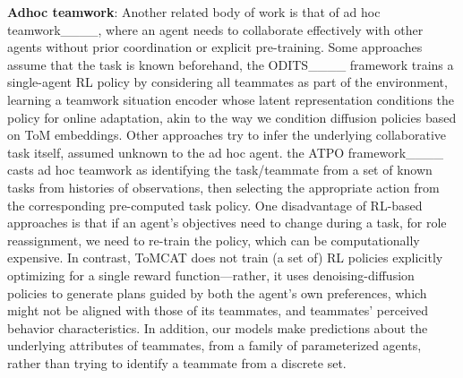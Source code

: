 
\textbf{Adhoc teamwork}: Another related body of work is that of ad hoc teamwork____, where an agent needs to collaborate effectively with other agents without prior coordination or explicit pre-training. Some approaches assume that the task is known beforehand, \eg the ODITS____ framework trains a single-agent RL policy by considering all teammates as part of the environment, learning a teamwork situation encoder whose latent representation conditions the policy for online adaptation, akin to the way we condition diffusion policies based on ToM embeddings. Other approaches try to infer the underlying collaborative task itself, assumed unknown to the ad hoc agent. \Eg the ATPO framework____ casts ad hoc teamwork as identifying the task/teammate from a set of known tasks from histories of observations, then selecting the appropriate action from the corresponding pre-computed task policy. One disadvantage of RL-based approaches is that if an agent's objectives need to change during a task, \eg for role reassignment, we need to re-train the policy, which can be computationally expensive. In contrast, ToMCAT does not train (a set of) RL policies explicitly optimizing for a single reward function---rather, it uses denoising-diffusion policies to generate plans guided by both the agent's own preferences, which might not be aligned with those of its teammates, and teammates' perceived behavior characteristics. In addition, our models make predictions about the underlying attributes of teammates, \ie from a family of parameterized agents, rather than trying to identify a teammate from a discrete set.

